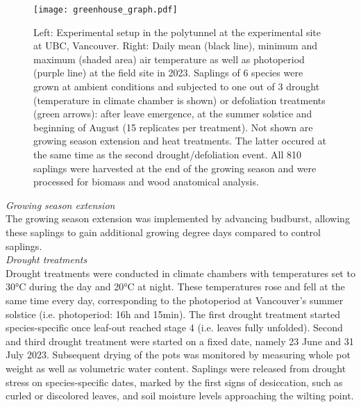 \documentclass{article}
\begin{document}
\begin{figure}[htbp]
	\centering
	\texttt{[image: greenhouse\_graph.pdf]} 
	\caption{Left: Experimental setup in the polytunnel at the experimental site at UBC, Vancouver. Right: Daily mean (black line), minimum and maximum (shaded area) air temperature as well as photoperiod (purple line) at the field site in 2023. Saplings of 6 species were grown at ambient conditions and subjected to one out of 3 drought (temperature in climate chamber is shown) or defoliation treatments (green arrows): after leave emergence, at the summer solstice and beginning of August (15 replicates per treatment). Not shown are growing season extension and heat treatments. The latter occured at the same time as the second drought/defoliation event. All 810 saplings were harvested at the end of the growing season and were processed for biomass and wood anatomical analysis.}
	\label{fig:fig_1xxx}
\end{figure}
	
	\textit{Growing season extension} \\
	The growing season extension was implemented by advancing budburst, allowing these saplings to gain additional growing degree days compared to control saplings.\\
	
	\textit{Drought treatments} \\
	Drought treatments were conducted in climate chambers with temperatures set to 30°C during the day and 20°C at night. These temperatures rose and fell at the same time every day, corresponding to the photoperiod at Vancouver’s summer solstice (i.e. photoperiod: 16h and 15min). 
	The first drought treatment started species-specific once leaf-out reached stage 4 (i.e. leaves fully unfolded). Second and third drought treatment were started on a fixed date, namely 23 June and 31 July 2023. Subsequent drying of the pots was monitored by measuring whole pot weight as well as volumetric water content. Saplings were released from drought stress on species-specific dates, marked by the first signs of desiccation, such as curled or discolored leaves, and soil moisture levels approaching the wilting point. \\
	
\end{document}
